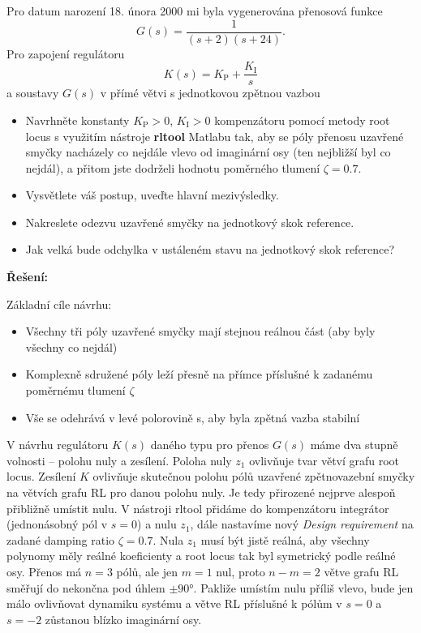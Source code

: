 \documentclass[twoside]{article}
\begin{document}
Pro datum narození 18. února 2000 mi byla vygenerována přenosová funkce
\begin{equation}
	G(s) = \frac{1}{(s+2)(s+24)}.
\end{equation}
Pro zapojení regulátoru 
\begin{equation}
	K(s) = K_\text{P} + \frac{K_\text{I}}{s}
\end{equation}
a soustavy $G(s)$ v přímé větvi s jednotkovou zpětnou vazbou
\begin{itemize}
	\item Navrhněte konstanty $K_\text{P} > 0$, $K_\text{I} > 0$ kompenzátoru pomocí metody root locus s využitím nástroje
	\textbf{rltool} Matlabu tak, aby se póly přenosu uzavřené smyčky nacházely co nejdále vlevo od
	imaginární osy (ten nejbližší byl co nejdál), a přitom jste dodrželi hodnotu poměrného tlumení
	$\zeta = 0.7$.
	\item Vysvětlete váš postup, uveďte hlavní mezivýsledky.
	\item Nakreslete odezvu uzavřené smyčky na jednotkový skok reference.
	\item Jak velká bude odchylka v ustáleném stavu na jednotkový skok reference? 
\end{itemize}

\textbf{Řešení:}

Základní cíle návrhu:
\begin{itemize}
	\item Všechny tři póly uzavřené smyčky mají stejnou reálnou část (aby byly všechny co nejdál)
	\item Komplexně sdružené póly leží přesně na přímce příslušné k zadanému poměrnému tlumení $\zeta$
	\item Vše se odehrává v levé polorovině s, aby byla zpětná vazba stabilní
\end{itemize}

V návrhu regulátoru $K(s)$ daného typu pro přenos $G(s)$ máme dva stupně volnosti -- polohu nuly a zesílení. Poloha nuly $z_1$ ovlivňuje tvar větví grafu root locus.
Zesílení $K$ ovlivňuje skutečnou polohu pólů uzavřené zpětnovazební smyčky na větvích grafu RL pro danou polohu nuly. Je tedy přirozené nejprve alespoň přibližně umístit nulu.
V nástroji rltool přidáme do kompenzátoru integrátor (jednonásobný pól v $s= 0$) a nulu $z_1$, dále nastavíme nový \textit{Design requirement} na 
zadané damping ratio $\zeta = 0.7$. Nula $z_1$ musí být jistě reálná, aby všechny polynomy měly reálné koeficienty a root locus tak byl symetrický podle reálné osy.
Přenos má $n = 3$ pólů, ale jen $m = 1$ nul, proto $n-m = 2$ větve grafu RL směřují do nekončna pod úhlem $\pm 90$°. Pakliže umístím nulu příliš vlevo,
bude jen málo ovlivňovat dynamiku systému a větve RL příslušné k pólům v $s = 0$ a $s = -2$ zůstanou blízko imaginární osy.
\end{document}
